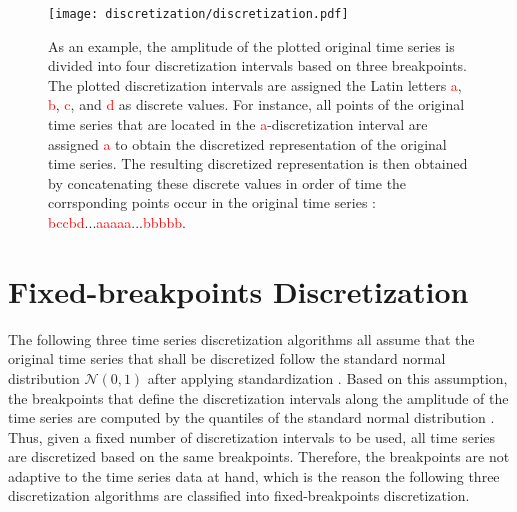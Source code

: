 \begin{figure}[htb]
\centering
\texttt{[image: discretization/discretization.pdf]}
\caption[Time Series Discretization - Basic Idea]{As an example, the amplitude of the plotted original time series is divided into four discretization intervals based on three breakpoints. The plotted discretization intervals are assigned the Latin letters \textcolor{red}{a}, \textcolor{red}{b}, \textcolor{red}{c}, and \textcolor{red}{d} as discrete values. For instance, all points of the original time series that are located in the \textcolor{red}{a}-discretization interval are assigned \textcolor{red}{a} to obtain the discretized representation of the original time series. The resulting discretized representation is then obtained by concatenating these discrete values in order of time the corrsponding points occur in the original time series \cite{Survey_Temporal_Discretization}: \textcolor{red}{b}\textcolor{red}{c}\textcolor{red}{c}\textcolor{red}{b}\textcolor{red}{d}...\textcolor{red}{a}\textcolor{red}{a}\textcolor{red}{a}\textcolor{red}{a}\textcolor{red}{a}...\textcolor{red}{b}\textcolor{red}{b}\textcolor{red}{b}\textcolor{red}{b}\textcolor{red}{b}.}
\label{fig:time_series_discretization}
\end{figure}

\section{Fixed-breakpoints Discretization}
The following three time series discretization algorithms all assume that the original time series that shall be discretized follow the standard normal distribution $\mathcal{N}(0,1)$ after applying standardization \cite{SAX_Lin}. Based on this assumption, the breakpoints that define the discretization intervals along the amplitude of the time series are computed by the quantiles of the standard normal distribution \cite{SAX_Lin}. Thus, given a fixed number of discretization intervals to be used, all time series are discretized based on the same breakpoints. Therefore, the breakpoints are not adaptive to the time series data at hand, which is the reason the following three discretization algorithms are classified into fixed-breakpoints discretization.




\pagebreak

